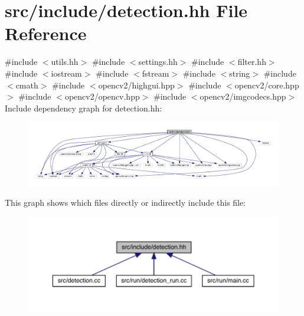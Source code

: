 \hypertarget{detection_8hh}{}\section{src/include/detection.hh File Reference}
\label{detection_8hh}
{\ttfamily \#include $<$utils.\+hh$>$}\newline
{\ttfamily \#include $<$settings.\+hh$>$}\newline
{\ttfamily \#include $<$filter.\+hh$>$}\newline
{\ttfamily \#include $<$iostream$>$}\newline
{\ttfamily \#include $<$fstream$>$}\newline
{\ttfamily \#include $<$string$>$}\newline
{\ttfamily \#include $<$cmath$>$}\newline
{\ttfamily \#include $<$opencv2/highgui.\+hpp$>$}\newline
{\ttfamily \#include $<$opencv2/core.\+hpp$>$}\newline
{\ttfamily \#include $<$opencv2/opencv.\+hpp$>$}\newline
{\ttfamily \#include $<$opencv2/imgcodecs.\+hpp$>$}\newline
Include dependency graph for detection.\+hh\+:
\nopagebreak
\begin{figure}[H]
\begin{center}
\leavevmode
\includegraphics[width=350pt]{detection_8hh__incl}
\end{center}
\end{figure}
This graph shows which files directly or indirectly include this file\+:
\nopagebreak
\begin{figure}[H]
\begin{center}
\leavevmode
\includegraphics[width=350pt]{detection_8hh__dep__incl}
\end{center}
\end{figure}
